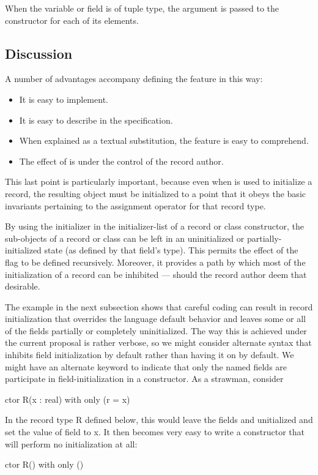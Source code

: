 When the variable or field is of tuple type, the
 argument is passed to the constructor for each of its elements.


\subsection{Discussion}
\label{noinit_Discussion}

A number of advantages accompany defining the  feature in this way:
\begin{itemize}
\item It is easy to implement.
\item It is easy to describe in the specification.
\item When explained as a textual substitution, the feature is easy to comprehend.
\item The effect of  is under the control of the record author.
\end{itemize}

This last point is particularly important, because even when  is used to
initialize a record, the resulting object must be initialized to a point that it obeys the
basic invariants pertaining to the assignment operator for that record type.

By using the  initializer in the initializer-list of a record or class
constructor, the sub-objects of a record or class can be left in an uninitialized or
partially-initialized state (as defined by that field's type).  This permits the effect of
the  flag to be defined recursively.  Moreover, it provides a path by which
most of the initialization of a record can be inhibited --- should the record author deem
that desirable.  

The example in the next subsection shows that careful coding can result in record
initialization that overrides the language default behavior and leaves some or all of the
fields partially or completely uninitialized.  The way this is achieved under the current
proposal is rather verbose, so we might consider alternate syntax that inhibits field
initialization by default rather than having it on by default.  We
might have an alternate keyword to indicate that only the named fields are participate in
field-initialization in a constructor.  As a strawman, consider 
\begin{chapel}
ctor R(x : real)
with only (r = x)
{}
\end{chapel}
In the record type R defined below, this would leave the fields  and 
unitialized and set the value of field  to x.  It then becomes very easy to write
a constructor that will perform no initialization at all:
\begin{chapel}
ctor R() with only () {}
\end{chapel}

